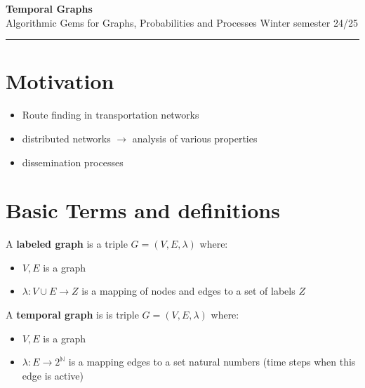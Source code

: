 \documentclass[12pt,a4paper]{article}
\begin{document}
\thispagestyle{empty}
\begin{center}
    {\huge \textbf{\color{primary} Temporal Graphs}} \\
    \vspace{0.4em}
    {\Large \color{secondary} Algorithmic Gems for Graphs, Probabilities and Processes Winter semester 24/25}
    \vspace{1em}
    \rule{\textwidth}{0.5pt}
\end{center}
\section{Motivation}
\begin{itemize}
  \item Route finding in transportation networks
  \item distributed networks $\rightarrow$ analysis of various properties
  \item dissemination processes
\end{itemize}


\section{Basic Terms and definitions}

\begin{tcolorbox}[title=Definition]
  A \textbf{labeled graph} \cite[page 94]{GHOSH201888} is a triple \( G = (V, E, \lambda) \) where:
    \begin{itemize}
        \item \( V, E \) is a graph
        \item $ \lambda: V \cup E \rightarrow Z$ is a mapping of nodes and edges to a set of labels $Z$
      \end{itemize}
\end{tcolorbox}
\begin{tcolorbox}[title=Definition]
  A \textbf{temporal graph} \cite[page 243]{Michail2015} is is triple \( G = (V, E, \lambda) \) where:
  \begin{itemize}
        \item \( V, E \) is a graph
        \item $ \lambda: E \rightarrow 2^{\mathbb{N}}$ is a mapping edges to a set natural numbers (time steps when this edge is active)
      \end{itemize}
\end{tcolorbox}
\end{document}
